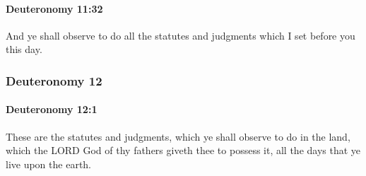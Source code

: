 		\paragraph{Deuteronomy 11:32} %
			\label{DEUTERONOMY-11-32}

			And ye shall observe to do all the statutes and judgments which I set before you this day.

	\subsubsection{Deuteronomy 12} %
		\label{DEUTERONOMY-12}

		\paragraph{Deuteronomy 12:1} %
			\label{DEUTERONOMY-12-1}

			These are the statutes and judgments, which ye shall observe to do in the land, which the LORD God of thy fathers giveth thee to possess it, all the days that ye live upon the earth.

